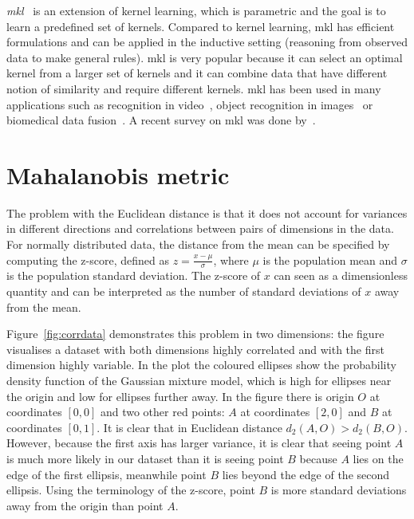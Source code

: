 \documentclass[12pt,a4paper]{report}
\begin{document}
\textit{\Ac{mkl}}~\citep{gonen2011multiple} is an extension of kernel learning, which is parametric and the goal is to learn a predefined set of kernels. Compared to kernel learning, \ac{mkl} has efficient formulations and can be applied in the inductive setting (reasoning from observed data to make general rules). \Ac{mkl} is very popular because it can select an optimal kernel from a larger set of kernels and it can combine data that have different notion of similarity and require different kernels. \ac{mkl} has been used in many applications such as recognition in video~\citep{chen2013event}, object recognition in images~\citep{bucak2014multiple} or biomedical data fusion~\citep{yu20102}. A recent survey on \ac{mkl} was done by~\citep{gonen2011multiple}.


\section{Mahalanobis metric} \label{chap:intro:mah}

The problem with the Euclidean distance is that it does not account for variances in different directions and correlations between pairs of dimensions in the data. For normally distributed data, the distance from the mean can be specified by computing the z-score, defined as $z = \frac{x-\mu}{\sigma}$, where $\mu$ is the population mean and $\sigma$ is the population standard deviation. The z-score of $x$ can seen as a dimensionless quantity and can be interpreted as the number of standard deviations of $x$ away from the mean.

Figure~\ref{fig:corrdata} demonstrates this problem in two dimensions: the figure visualises a dataset with both dimensions highly correlated and with the first dimension highly variable. In the plot the coloured ellipses show the probability density function of the Gaussian mixture model, which is high for ellipses near the origin and low for ellipses further away. In the figure there is origin $O$ at coordinates $[0,0]$ and two other red points: $A$ at coordinates $[2,0]$ and $B$ at coordinates $[0,1]$. It is clear that in Euclidean distance $d_2(A,O)>d_2(B,O)$. However, because the first axis has larger variance, it is clear that seeing point $A$ is much more likely in our dataset than it is seeing point $B$ because $A$ lies on the edge of the first ellipsis, meanwhile point $B$ lies beyond the edge of the second ellipsis. Using the terminology of the z-score, point $B$ is more standard deviations away from the origin than point $A$.
\end{document}
